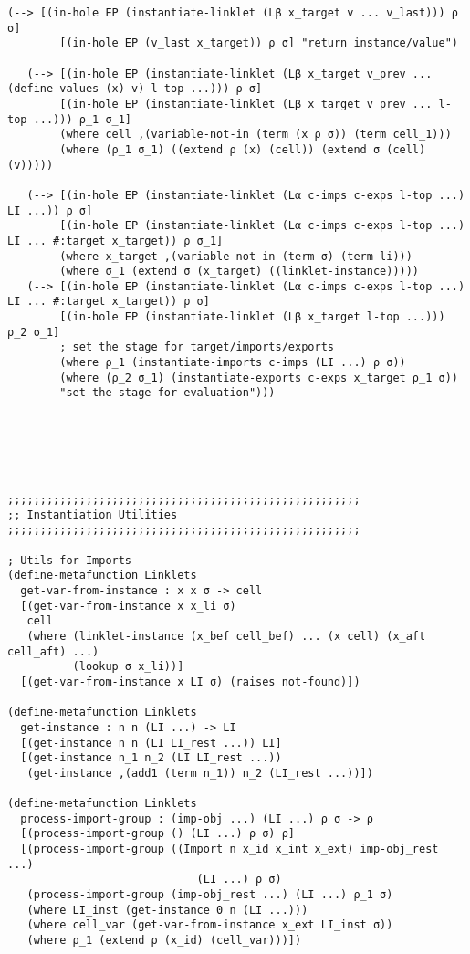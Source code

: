 \begin{lstlisting}[language=pltredex,
                basicstyle=\ttfamily\scriptsize,
                numbers=none, xleftmargin=2em]
   (--> [(in-hole EP (instantiate-linklet (Lβ x_target v ... v_last))) ρ σ]
        [(in-hole EP (v_last x_target)) ρ σ] "return instance/value")

   (--> [(in-hole EP (instantiate-linklet (Lβ x_target v_prev ... (define-values (x) v) l-top ...))) ρ σ]
        [(in-hole EP (instantiate-linklet (Lβ x_target v_prev ... l-top ...))) ρ_1 σ_1]
        (where cell ,(variable-not-in (term (x ρ σ)) (term cell_1)))
        (where (ρ_1 σ_1) ((extend ρ (x) (cell)) (extend σ (cell) (v)))))

   (--> [(in-hole EP (instantiate-linklet (Lα c-imps c-exps l-top ...) LI ...)) ρ σ]
        [(in-hole EP (instantiate-linklet (Lα c-imps c-exps l-top ...) LI ... #:target x_target)) ρ σ_1]
        (where x_target ,(variable-not-in (term σ) (term li)))
        (where σ_1 (extend σ (x_target) ((linklet-instance)))))
   (--> [(in-hole EP (instantiate-linklet (Lα c-imps c-exps l-top ...) LI ... #:target x_target)) ρ σ]
        [(in-hole EP (instantiate-linklet (Lβ x_target l-top ...))) ρ_2 σ_1]
        ; set the stage for target/imports/exports
        (where ρ_1 (instantiate-imports c-imps (LI ...) ρ σ))
        (where (ρ_2 σ_1) (instantiate-exports c-exps x_target ρ_1 σ))
        "set the stage for evaluation")))






;;;;;;;;;;;;;;;;;;;;;;;;;;;;;;;;;;;;;;;;;;;;;;;;;;;;;;
;; Instantiation Utilities
;;;;;;;;;;;;;;;;;;;;;;;;;;;;;;;;;;;;;;;;;;;;;;;;;;;;;;

; Utils for Imports
(define-metafunction Linklets
  get-var-from-instance : x x σ -> cell
  [(get-var-from-instance x x_li σ)
   cell
   (where (linklet-instance (x_bef cell_bef) ... (x cell) (x_aft cell_aft) ...)
          (lookup σ x_li))]
  [(get-var-from-instance x LI σ) (raises not-found)])

(define-metafunction Linklets
  get-instance : n n (LI ...) -> LI
  [(get-instance n n (LI LI_rest ...)) LI]
  [(get-instance n_1 n_2 (LI LI_rest ...))
   (get-instance ,(add1 (term n_1)) n_2 (LI_rest ...))])

(define-metafunction Linklets
  process-import-group : (imp-obj ...) (LI ...) ρ σ -> ρ
  [(process-import-group () (LI ...) ρ σ) ρ]
  [(process-import-group ((Import n x_id x_int x_ext) imp-obj_rest ...)
                             (LI ...) ρ σ)
   (process-import-group (imp-obj_rest ...) (LI ...) ρ_1 σ)
   (where LI_inst (get-instance 0 n (LI ...)))
   (where cell_var (get-var-from-instance x_ext LI_inst σ))
   (where ρ_1 (extend ρ (x_id) (cell_var)))])


\end{lstlisting}
